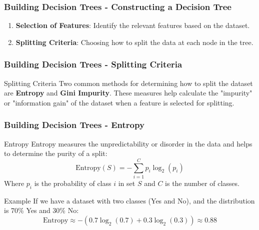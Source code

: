 \documentclass[aspectratio=169]{beamer}
\begin{document}
\begin{frame}[fragile]
    \frametitle{Building Decision Trees - Constructing a Decision Tree}
    \begin{enumerate}
        \item \textbf{Selection of Features}: Identify the relevant features based on the dataset.
        \item \textbf{Splitting Criteria}: Choosing how to split the data at each node in the tree.
    \end{enumerate}
\end{frame}

\begin{frame}[fragile]
    \frametitle{Building Decision Trees - Splitting Criteria}
    \begin{block}{Splitting Criteria}
        Two common methods for determining how to split the dataset are \textbf{Entropy} and \textbf{Gini Impurity}. 
        These measures help calculate the "impurity" or "information gain" of the dataset when a feature is selected for splitting.
    \end{block}
\end{frame}

\begin{frame}[fragile]
    \frametitle{Building Decision Trees - Entropy}
    \begin{block}{Entropy}
        Entropy measures the unpredictability or disorder in the data and helps to determine the purity of a split:
        \begin{equation}
            \text{Entropy}(S) = -\sum_{i=1}^{C} p_i \log_2(p_i)
        \end{equation}
        Where \(p_i\) is the probability of class \(i\) in set \(S\) and \(C\) is the number of classes.
    \end{block}
    \begin{block}{Example}
        If we have a dataset with two classes (Yes and No), and the distribution is 70\% Yes and 30\% No:
        \begin{equation}
            \text{Entropy} \approx - (0.7 \log_2(0.7) + 0.3 \log_2(0.3)) \approx 0.88 
        \end{equation}
    \end{block}
\end{frame}
\end{document}
